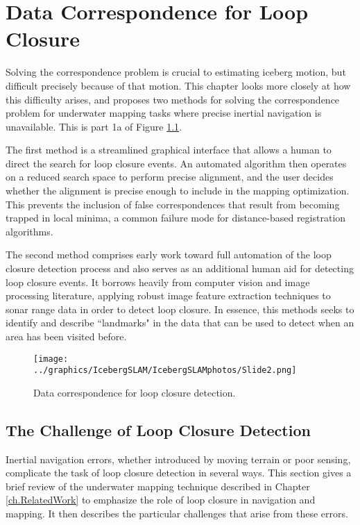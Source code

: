 
\chapter{Data Correspondence for Loop Closure}
\label{ch.LoopClosure}

Solving the correspondence problem is crucial to estimating iceberg motion, but difficult precisely because of that motion. This chapter looks more closely at how this difficulty arises, and proposes two methods for solving the correspondence problem for underwater mapping tasks where precise inertial navigation is unavailable. This is part 1a of Figure \ref{fig:icebergSLAMLC}.

The first method is a streamlined graphical interface that allows a human to direct the search for loop closure events. An automated algorithm then operates on a reduced search space to perform precise alignment, and the user decides whether the alignment is precise enough to include in the mapping optimization. This prevents the inclusion of false correspondences that result from becoming trapped in local minima, a common failure mode for distance-based registration algorithms.

The second method comprises early work toward full automation of the loop closure detection process and also serves as an additional human aid for detecting loop closure events. It borrows heavily from computer vision and image processing literature, applying robust image feature extraction techniques to sonar range data in order to detect loop closure. In essence, this methods seeks to identify and describe ``landmarks" in the data that can be used to detect when an area has been visited before.  

\begin{figure}[htb]
   \centering
   \texttt{[image: ../graphics/IcebergSLAM/IcebergSLAMphotos/Slide2.png]} %
   \caption{Data correspondence for loop closure detection. }
   \label{fig:icebergSLAMLC}
\end{figure}

\section{The Challenge of Loop Closure Detection}

Inertial navigation errors, whether introduced by moving terrain or poor sensing, complicate the task of loop closure detection in several ways. This section gives a brief review of the underwater mapping technique described in Chapter \ref{ch.RelatedWork} to emphasize the role of loop closure in navigation and mapping. It then describes the particular challenges that arise from these errors.

